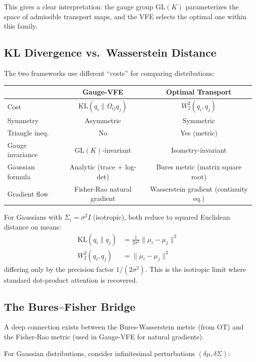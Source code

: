 \documentclass[11pt]{article}
\newcommand{\KL}{\mathrm{KL}}
\newcommand{\GL}{\mathrm{GL}}
\begin{document}
This gives a clear interpretation: the gauge group $\GL(K)$ parameterizes the space of admissible transport maps, and the VFE selects the optimal one within this family.

\subsection{KL Divergence vs.\ Wasserstein Distance}

The two frameworks use different ``costs'' for comparing distributions:

\begin{center}
\begin{tabular}{lcc}
\toprule
& \textbf{Gauge-VFE} & \textbf{Optimal Transport} \\
\midrule
Cost & $\KL(q_i \| \Omega_{ij}q_j)$ & $W_2^2(q_i, q_j)$ \\
Symmetry & Asymmetric & Symmetric \\
Triangle ineq. & No & Yes (metric) \\
Gauge invariance & $\GL(K)$-invariant & Isometry-invariant \\
Gaussian formula & Analytic (trace + log-det) & Bures metric (matrix square root) \\
Gradient flow & Fisher-Rao natural gradient & Wasserstein gradient (continuity eq.) \\
\bottomrule
\end{tabular}
\end{center}

For Gaussians with $\Sigma_i = \sigma^2 I$ (isotropic), both reduce to squared Euclidean distance on means:
\begin{align}
\KL(q_i \| q_j) &= \frac{1}{2\sigma^2}\|\mu_i - \mu_j\|^2 \\
W_2^2(q_i, q_j) &= \|\mu_i - \mu_j\|^2
\end{align}
differing only by the precision factor $1/(2\sigma^2)$. This is the isotropic limit where standard dot-product attention is recovered.

\subsection{The Bures--Fisher Bridge}

A deep connection exists between the Bures-Wasserstein metric (from OT) and the Fisher-Rao metric (used in Gauge-VFE for natural gradients).

For Gaussian distributions, consider infinitesimal perturbations $(\delta\mu, \delta\Sigma)$:
\end{document}
